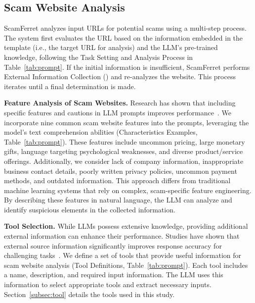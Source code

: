 \documentclass[runningheads]{llncs}
\begin{document}
\subsection{ Scam Website Analysis}
ScamFerret analyzes input URLs for potential scams using a multi-step process.
The system first evaluates the URL based on the information embedded in the template (i.e., the target URL for analysis) and the LLM's pre-trained knowledge, following the Task Setting and Analysis Process in Table~\ref{tab:prompt}.
If the initial information is insufficient, ScamFerret performs External Information Collection () and re-analyzes the website.
This process iterates until a final determination is made.

\noindent\textbf{Feature Analysis of Scam Websites.}
Research has shown that including specific features and cautions in LLM prompts improves performance~\cite{DBLP:journals/access/KoideNC24}.
We incorporate nine common scam website features into the prompts, leveraging the model's text comprehension abilities (Characteristics Examples, Table~\ref{tab:prompt}).
These features include uncommon pricing, large monetary gifts, language targeting psychological weaknesses, and diverse product/service offerings.
Additionally, we consider lack of company information, inappropriate business contact details, poorly written privacy policies, uncommon payment methods, and outdated information.
This approach differs from traditional machine learning systems that rely on complex, scam-specific feature engineering.
By describing these features in natural language, the LLM can analyze and identify suspicious elements in the collected information.

\noindent\textbf{Tool Selection.}
While LLMs possess extensive knowledge, providing additional external information can enhance their performance.
Studies have shown that external source information significantly improves response accuracy for challenging tasks~\cite{DBLP:journals/corr/abs-2312-10997}.
We define a set of tools that provide useful information for scam website analysis (Tool Definitions, Table~\ref{tab:prompt}).
Each tool includes a name, description, and required input information.
The LLM uses this information to select appropriate tools and extract necessary inputs.
Section~\ref{subsec:tool} details the tools used in this study.
\end{document}

